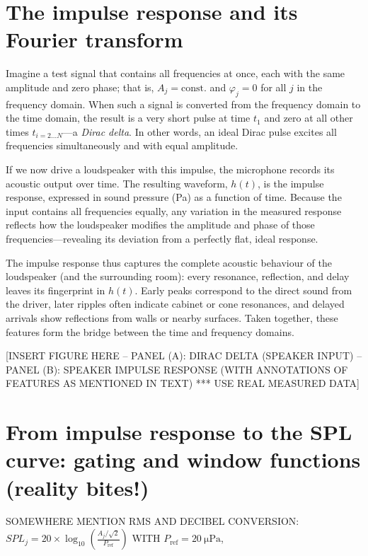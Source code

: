 \documentclass[12pt,a4paper]{article}
\begin{document}
\section{The impulse response and its Fourier transform}

Imagine a test signal that contains all frequencies at once, each with the same amplitude and zero phase; that is, $A_j = \text{const.}$ and $\varphi_j = 0$ for all $j$ in the frequency domain.  
When such a signal is converted from the frequency domain to the time domain, the result is a very short pulse at time $t_1$ and zero at all other times $t_{i = 2\ldots N}$—a \emph{Dirac delta}.  
In other words, an ideal Dirac pulse excites all frequencies simultaneously and with equal amplitude.

If we now drive a loudspeaker with this impulse, the microphone records its acoustic output over time.  
The resulting waveform, $h(t)$, is the impulse response, expressed in sound pressure (Pa) as a function of time.  
Because the input contains all frequencies equally, any variation in the measured response reflects how the loudspeaker modifies the amplitude and phase of those frequencies—revealing its deviation from a perfectly flat, ideal response.

The impulse response thus captures the complete acoustic behaviour of the loudspeaker (and the surrounding room): every resonance, reflection, and delay leaves its fingerprint in $h(t)$.  
Early peaks correspond to the direct sound from the driver, later ripples often indicate cabinet or cone resonances, and delayed arrivals show reflections from walls or nearby surfaces.  
Taken together, these features form the bridge between the time and frequency domains.


[INSERT FIGURE HERE -- PANEL (A): DIRAC DELTA (SPEAKER INPUT) -- PANEL (B): SPEAKER IMPULSE RESPONSE (WITH ANNOTATIONS OF FEATURES AS MENTIONED IN TEXT) *** USE REAL MEASURED DATA]


\section{From impulse response to the SPL curve: gating and window functions (reality bites!)}

SOMEWHERE MENTION RMS AND DECIBEL CONVERSION: $SPL_j = 20 \times \log_{10} \!\left( \frac{A_j / \sqrt{2}}{P_{\mathrm{ref}}} \right)$ WITH $P_{\mathrm{ref}} = \SI{20}{\micro\pascal}$,
\end{document}

